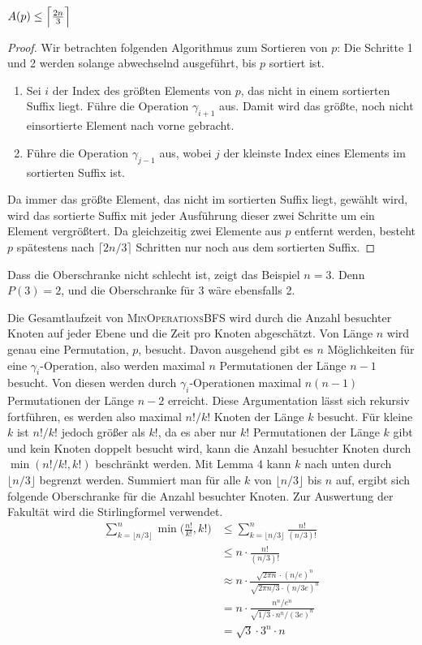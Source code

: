 \documentclass[a4paper, 11pt, ngerman]{article}
\begin{document}
\begin{lemma}
    $A(p) \le \Big{\lceil} \frac {2n} 3 \Big{\rceil}$
\end{lemma}

\begin{proof}
    Wir betrachten folgenden Algorithmus zum Sortieren von $p$: Die Schritte 1 und 2 werden solange abwechselnd ausgeführt, bis $p$ sortiert ist.
    \begin{enumerate}
        \item Sei $i$ der Index des größten Elements von $p$, das nicht in einem sortierten Suffix liegt. Führe die Operation $\gamma_{i+1}$ aus. Damit wird das größte, noch nicht einsortierte Element nach vorne gebracht.
        \item Führe die Operation $\gamma_{j-1}$ aus, wobei $j$ der kleinste Index eines Elements im sortierten Suffix ist.
    \end{enumerate}
    Da immer das größte Element, das nicht im sortierten Suffix liegt, gewählt wird, wird das sortierte Suffix mit jeder Ausführung dieser zwei Schritte um ein Element vergrößtert. Da gleichzeitig zwei Elemente aus $p$ entfernt werden, besteht $p$ spätestens nach $\lceil 2n / 3 \rceil$ Schritten nur noch aus dem sortierten Suffix.
\end{proof}

Dass die Oberschranke nicht schlecht ist, zeigt das Beispiel $n = 3$. Denn $P(3) = 2$, und die Oberschranke für 3 wäre ebensfalls 2.

Die Gesamtlaufzeit von \textsc{MinOperationsBFS} wird durch die Anzahl besuchter Knoten auf jeder Ebene und die Zeit pro Knoten abgeschätzt. Von Länge $n$ wird genau eine Permutation, $p$, besucht. Davon ausgehend gibt es $n$ Möglichkeiten für eine $\gamma_i$-Operation, also werden maximal $n$ Permutationen der Länge $n - 1$ besucht. Von diesen werden durch $\gamma_i$-Operationen maximal $n(n-1)$ Permutationen der Länge $n - 2$ erreicht. Diese Argumentation lässt sich rekursiv fortführen, es werden also maximal $n! / k!$ Knoten der Länge $k$ besucht. Für kleine $k$ ist $n! / k!$ jedoch größer als $k!$, da es aber nur $k!$ Permutationen der Länge $k$ gibt und kein Knoten doppelt besucht wird, kann die Anzahl besuchter Knoten durch $\min(n! / k!, k!)$ beschränkt werden. Mit Lemma 4 kann $k$ nach unten durch $\lfloor n/3 \rfloor$ begrenzt werden. Summiert man für alle $k$ von $\lfloor n/3 \rfloor$ bis $n$ auf, ergibt sich folgende Oberschranke für die Anzahl besuchter Knoten. Zur Auswertung der Fakultät wird die Stirlingformel verwendet.
\begin{align*}
    \sum_{k = \lfloor n/3 \rfloor}^n \min \bigg ( \frac {n!}{k!}, k! \bigg )
     & \le \sum_{k = \lfloor n/3 \rfloor}^n  \frac {n!} {(n/3)!}
    \\ & \le n \cdot \frac {n!} {(n/3)!}
    \\ & \approx n \cdot
    \frac {\sqrt{2 \pi n} \cdot (n/e)^n} {\sqrt{2 \pi n/3} \cdot (n/3e)^n}
    \\ & = n \cdot
    \frac {n^n / e^n} {\sqrt{1/3} \cdot n^n / (3e)^n}
    \\ & = \sqrt 3 \cdot 3^n \cdot n
\end{align*}
\end{document}

